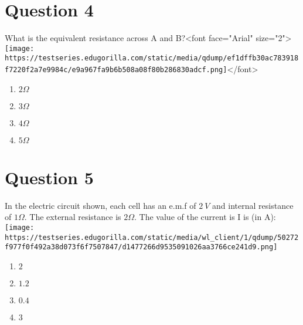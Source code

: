 \documentclass{article}
\begin{document}
\section*{Question 4}
What is the equivalent resistance across A and B?<font face="Arial" size="2">\newline\newline\texttt{[image: https://testseries.edugorilla.com/static/media/qdump/ef1dffb30ac783918f7220f2a7e9984c/e9a967fa9b6b508a08f80b286830adcf.png]}</font>
\begin{enumerate}[label=(\alph*)]
\item \(2 \Omega\)
\item \(3 \Omega\)
\item \(4 \Omega\)
\item \(5 \Omega\)
\end{enumerate}
\newpage
\section*{Question 5}
In the electric circuit shown, each cell has an e.m.f of \(2 {~V}\) and internal resistance of \(1 \Omega\). The external resistance is \(2 \Omega\). The value of the current is I is (in A):\texttt{[image: https://testseries.edugorilla.com/static/media/wl\_client/1/qdump/50272f977f0f492a38d073f6f7507847/d1477266d9535091026aa3766ce241d9.png]}\newline
\begin{enumerate}[label=(\alph*)]
\item \(2\)
\item \(1.2\)
\item \(0.4\)
\item \(3\)
\end{enumerate}
\newpage
\end{document}
